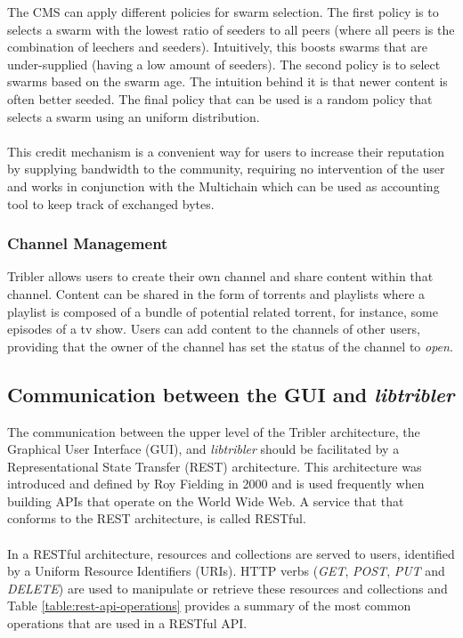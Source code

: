 The CMS can apply different policies for swarm selection. The first policy is to selects a swarm with the lowest ratio of seeders to all peers (where all peers is the combination of leechers and seeders). Intuitively, this boosts swarms that are under-supplied (having a low amount of seeders). The second policy is to select swarms based on the swarm age. The intuition behind it is that newer content is often better seeded. The final policy that can be used is a random policy that selects a swarm using an uniform distribution.\\\\
This credit mechanism is a convenient way for users to increase their reputation by supplying bandwidth to the community, requiring no intervention of the user and works in conjunction with the Multichain which can be used as accounting tool to keep track of exchanged bytes.

\subsubsection{\textbf{Channel Management}}
Tribler allows users to create their own channel and share content within that channel. Content can be shared in the form of torrents and playlists where a playlist is composed of a bundle of potential related torrent, for instance, some episodes of a tv show. Users can add content to the channels of other users, providing that the owner of the channel has set the status of the channel to \emph{open}.

\subsection{Communication between the GUI and \emph{libtribler}}
\label{subsec:communication-gui-libtribler}
The communication between the upper level of the Tribler architecture, the Graphical User Interface (GUI), and \emph{libtribler} should be facilitated by a Representational State Transfer (REST) architecture. This architecture was introduced and defined by Roy Fielding in 2000\cite{fielding2000fielding} and is used frequently when building APIs that operate on the World Wide Web. A service that that conforms to the REST architecture, is called RESTful.\\\\
In a RESTful architecture, resources and collections are served to users, identified by a Uniform Resource Identifiers (URIs). HTTP verbs (\emph{GET}, \emph{POST}, \emph{PUT} and \emph{DELETE}) are used to manipulate or retrieve these resources and collections and Table \ref{table:rest-api-operations} provides a summary of the most common operations that are used in a RESTful API.\\

